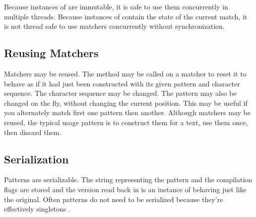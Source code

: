 Because instances of  are immutable, it is safe to use
them concurrently in multiple threads.  Because instances of
 contain the state of the current match, it is not
thread safe to use matchers concurrently without synchronization.

\subsection{Reusing Matchers}

Matchers may be reused.  The method  may be called on a
matcher to reset it to behave as if it had just been constructed with
its given pattern and character sequence.  The character sequence may
be changed.  The pattern may also be changed on the fly, without
changing the current position.  This may be useful if you alternately
match first one pattern then another.  Although matchers may be
reused, the typical usage pattern is to construct them for a text, use
them once, then discard them.


\subsection{Serialization}

Patterns are serializable.  The string representing the pattern and
the compilation flags are stored and the version read back in is an
instance of  behaving just like the original.  Often
patterns do not need to be serialized because they're effectively
singletons .






